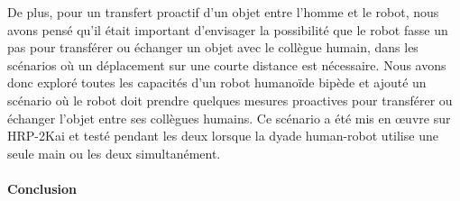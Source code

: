 
De plus, pour un transfert proactif d'un objet entre l'homme et le robot, nous avons pensé qu'il était important d'envisager la possibilité que le robot fasse un pas pour transférer ou échanger un objet avec le collègue humain, dans les scénarios où un déplacement sur une courte distance est nécessaire. Nous avons donc exploré toutes les capacités d'un robot humanoïde bipède et ajouté un scénario où le robot doit prendre quelques mesures proactives pour transférer ou échanger l'objet entre ses collègues humains. Ce scénario a été mis en œuvre sur HRP-2Kai et testé pendant les deux lorsque la dyade human-robot utilise une seule main ou les deux simultanément. 




\paragraph*{\LARGE {Conclusion \\}\\}


